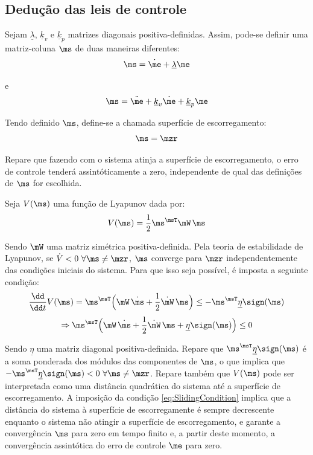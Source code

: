 \documentclass[]{politex}
\begin{document}
\subsection{Dedução das leis de controle}

Sejam $\underline{\lambda}$, $\underline{k}_v$ e $\underline{k}_p$ matrizes diagonais positiva-definidas. Assim, pode-se definir uma matriz-coluna $\ms$ de duas maneiras diferentes:
\begin{equation} \label{eq:SlidingSurfaces}
\ms = \dot{\me} + \underline{\lambda}\me
\end{equation}

e
\begin{equation} \label{eq:SlidingSurfaces_}
\ms = \ddot{\me} + \underline{k}_v\dot{\me} + \underline{k}_p\me
\end{equation}

Tendo definido $\ms$, define-se a chamada superfície de escorregamento:
\begin{equation} \label{eq:SuperficieDeEscorregamento}
\ms = \mzr
\end{equation}

Repare que fazendo com o sistema atinja a superfície de escorregamento, o erro de controle tenderá assintóticamente a zero, independente de qual das definições de $\ms$ for escolhida.
 
Seja $V(\ms)$ uma função de Lyapunov dada por:
\begin{equation}
V(\ms) = \frac{1}{2} \ms^\msT \mW \, \ms
\end{equation}

Sendo $\mW$ uma matriz simétrica positiva-definida. Pela teoria de estabilidade de Lyapunov, se $\dot{V} < 0 \,\, \forall \ms \neq \mzr$, $\ms$ converge para $\mzr$ independentemente das condi\c{c}\~oes iniciais do sistema. Para que isso seja poss\'ivel, \'e imposta a seguinte condi\c{c}\~ao:
\begin{equation} \label{eq:SlidingCondition}
\frac{\dd}{\dd t} V(\ms) = \ms^\msT \Big( \mW \, \dot{\ms} + \frac{1}{2}  \dot{\mW} \, \ms \Big) \leq -   \ms^\msT \underline{\eta} \sign(\ms) 
\end{equation}
\begin{equation}
\Rightarrow \ms^\msT \Big( \mW \, \dot{\ms} + \frac{1}{2}  \dot{\mW} \, \ms + \underline{\eta} \sign(\ms)  \Big) \leq 0
\end{equation}

Sendo $\underline{\eta}$ uma matriz diagonal positiva-definida. Repare que $\ms^\msT \underline{\eta} \sign(\ms)$ \'e a soma ponderada dos m\'odulos das componentes de $\ms$, o que implica que $-  \ms^\msT \underline{\eta} \sign(\ms) < 0 \,\, \forall \ms \neq \mzr$. Repare tamb\'em que $V(\ms)$ pode ser interpretada como uma distância quadrática do sistema até a superfície de escorregamento. A imposição da condição \eqref{eq:SlidingCondition} implica que a distância do sistema à superfície de escorregamente é sempre decrescente enquanto o sistema não atingir a superfície de escorregamento, e garante a convergência $\ms$ para zero em tempo finito e, a partir deste momento, a convergência assintótica do erro de controle $\me$ para zero. 
\end{document}
